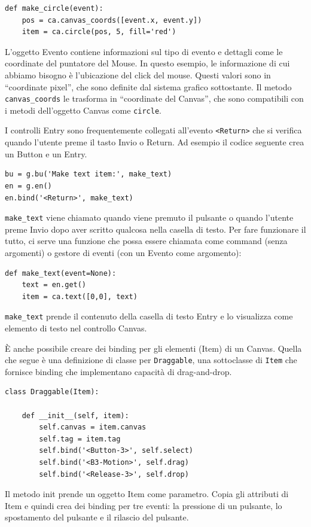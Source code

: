 \documentclass[10pt]{book}
\begin{document}
\begin{verbatim}
def make_circle(event):
    pos = ca.canvas_coords([event.x, event.y])
    item = ca.circle(pos, 5, fill='red')
\end{verbatim}
%
L'oggetto Evento contiene informazioni sul tipo di evento e dettagli come le coordinate del puntatore del Mouse. In questo esempio, le informazione di cui abbiamo bisogno è l'ubicazione del click del mouse. Questi valori sono in ``coordinate pixel'', che sono definite dal sistema grafico sottostante. Il metodo \verb"canvas_coords" le trasforma in ``coordinate del Canvas'', che sono compatibili con i metodi dell'oggetto Canvas come {\tt circle}.

I controlli Entry sono frequentemente collegati all'evento \verb"<Return>" che si verifica quando l'utente preme il tasto {\sf Invio} o {\sf Return}.  Ad esempio il codice seguente crea un Button e un Entry.

\begin{verbatim}
bu = g.bu('Make text item:', make_text)
en = g.en()
en.bind('<Return>', make_text)
\end{verbatim}
%
\verb"make_text" viene chiamato quando viene premuto il pulsante o quando l'utente preme {\sf Invio} dopo aver scritto qualcosa nella casella di testo. Per fare funzionare il tutto, ci serve una funzione che possa essere chiamata come command (senza argomenti) o gestore di eventi (con un Evento come argomento):

\begin{verbatim}
def make_text(event=None):
    text = en.get()
    item = ca.text([0,0], text)
\end{verbatim}
%
\verb"make_text" prende il contenuto della casella di testo Entry e lo visualizza come elemento di testo nel controllo Canvas.

È anche possibile creare dei binding per gli elementi (Item) di un Canvas. Quella che segue è una definizione di classe per {\tt Draggable}, una sottoclasse di {\tt Item} che fornisce binding che implementano capacità di drag-and-drop.

\begin{verbatim}
class Draggable(Item):

    def __init__(self, item):
        self.canvas = item.canvas
        self.tag = item.tag
        self.bind('<Button-3>', self.select)
        self.bind('<B3-Motion>', self.drag)
        self.bind('<Release-3>', self.drop)
\end{verbatim}
%
Il metodo init prende un oggetto Item come parametro. Copia gli attributi di Item e quindi crea dei binding per tre eventi: la pressione di un pulsante, lo spostamento del pulsante e il rilascio del pulsante.
\end{document}
